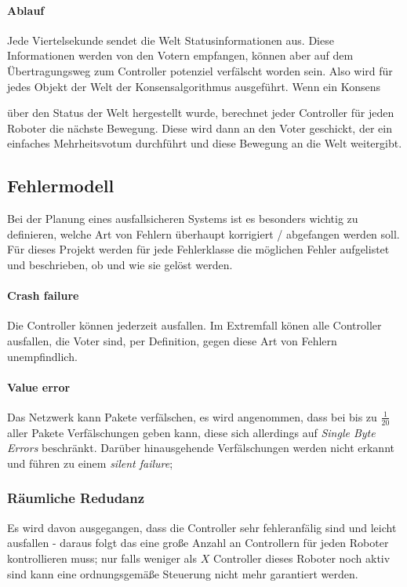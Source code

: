 \documentclass[
    12pt,
    bibliography=totoc,
    ngerman,
	enabledeprecatedfontcommands
]{scrartcl}
\begin{document}
\paragraph{Ablauf} Jede Viertelsekunde sendet die Welt Statusinformationen aus.  Diese Informationen werden von den Votern empfangen, k{\"{o}}nnen
aber auf dem {\"{U}}bertragungsweg zum Controller potenziel verf{\"{a}}lscht worden sein. Also wird f{\"{u}}r jedes Objekt der Welt der Konsensalgorithmus ausgef{\"{u}}hrt. Wenn ein Konsens {\"{u}ber den Status der Welt hergestellt wurde, berechnet 
jeder Controller f{\"{u}}r jeden Roboter die n{\"{a}}chste Bewegung. Diese wird dann an den Voter geschickt, der ein einfaches Mehrheitsvotum durchf{\"{u}}hrt und diese Bewegung an die Welt weitergibt.

\subsection{Fehlermodell} \label{error-model}
Bei der Planung eines ausfallsicheren Systems ist es besonders wichtig zu definieren, welche Art von Fehlern
{\"{u}}berhaupt korrigiert / abgefangen werden soll. F{\"{u}}r dieses Projekt werden f{\"{u}}r jede Fehlerklasse
die m{\"{o}}glichen Fehler aufgelistet und beschrieben, ob und wie sie gel{\"{o}}st werden.

\paragraph{Crash failure} Die Controller k{\"{o}}nnen jederzeit ausfallen. Im Extremfall k{\"{o}}nen alle Controller ausfallen, die Voter sind, per Definition, gegen diese Art von Fehlern unempfindlich.

\paragraph{Value error} Das Netzwerk kann Pakete verf{\"{a}}lschen, es wird angenommen, dass bei bis zu $\frac{1}{20}$ aller Pakete Verf{\"{a}}lschungen geben kann, diese sich allerdings auf \textit{Single Byte Errors} beschr{\"{a}}nkt.
Dar{\"{u}}ber hinausgehende Verf{\"{a}}lschungen werden nicht erkannt und f{\"{u}}hren zu einem \textit{silent failure}; 

\subsubsection{R{\"{a}}umliche Redudanz}
Es wird davon ausgegangen, dass die Controller sehr fehleranf{\"{a}}lig sind und leicht ausfallen - daraus folgt das eine gro{\ss}e
Anzahl an Controllern f{\"{u}}r jeden Roboter kontrollieren muss; nur falls weniger als $X$ Controller dieses Roboter noch aktiv
sind kann eine ordnungsgem{\"{a}}{\ss}e Steuerung nicht mehr garantiert werden.

}
\end{document}
